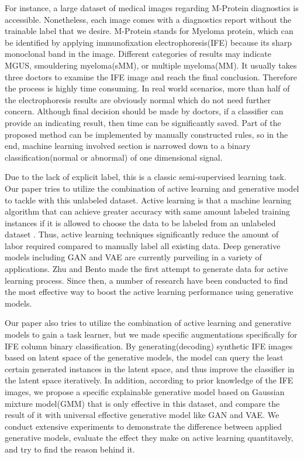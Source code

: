\documentclass[letterpaper]{article}
\begin{document}
For instance, a large dataset of medical images regarding M-Protein diagnostics is accessible. Nonetheless, each image comes with a diagnostics report without the trainable label that we desire. M-Protein stands for Myeloma protein, which can be identified by applying immunofixation electrophoresis(IFE) because its sharp monoclonal band in the image. Different categories of results may indicate MGUS, smouldering myeloma(sMM), or multiple myeloma(MM). It usually takes three doctors to examine the IFE image and reach the final conclusion. Therefore the process is highly time consuming. In real world scenarios, more than half of the electrophoresis results are obviously normal which do not need further concern. Although final decision should be made by doctors, if a classifier can provide an indicating result, then time can be significantly saved. Part of the proposed method can be implemented by manually constructed rules, so in the end, machine learning involved section is narrowed down to a binary classification(normal or abnormal) of one dimensional signal.

Due to the lack of explicit label, this is a classic semi-supervised learning task. Our paper tries to utilize the combination of active learning and generative model to tackle with this unlabeled dataset. Active learning is that a machine learning algorithm that can achieve greater accuracy with same amount labeled training instances if it is allowed to choose the data to be labeled from an unlabeled dataset \cite{settles2009active}. Thus, active learning techniques significantly reduce the amount of labor required compared to manually label all existing data. Deep generative models including GAN and VAE are currently purveiling in a variety of applications. Zhu and Bento made the first attempt\cite{Zhu2017GenerativeAA} to generate data for active learning process. Since then, a number of research have been conducted to find the most effective way to boost the active learning performance using generative models.

Our paper also tries to utilize the combination of active learning and generative models to gain a task learner, but we made specific augmentations specifically for IFE column binary classification. By generating(decoding) synthetic IFE images based on latent space of the generative models, the model can query the least certain generated instances in the latent space, and thus improve the classifier in the latent space iteratively. In addition, according to prior knowledge of the IFE images, we propose a specific explainable generative model based on Gaussian mixture model(GMM) that is only effective in this dataset, and compare the result of it with universal effective generative model like GAN and VAE. We conduct extensive experiments to demonstrate the difference between applied generative models, evaluate the effect they make on active learning quantitavely, and try to find the reason behind it.
\end{document}
